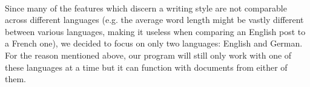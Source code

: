 \\
Since many of the features which discern a writing style are not comparable across different languages (e.g. the average word length might be vastly different between various languages, making it useless when comparing an English post to a French one), we decided to focus on only two languages: English and German. For the reason mentioned above, our program will still only work with one of these languages at a time but it can function with documents from either of them.